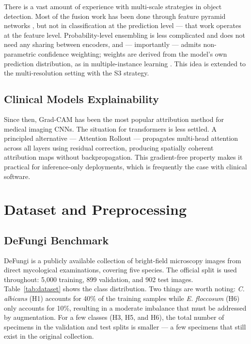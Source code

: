 \documentclass[conference]{IEEEtran}
\begin{document}
There is a vast amount of experience with multi-scale strategies in object
detection. Most of the fusion work has been done through feature pyramid
networks \cite{lin2017}, but not in classification at the prediction level
--- that work operates at the feature level. Probability-level ensembling is
less complicated and does not need any sharing between encoders, and ---
importantly --- admits non-parametric confidence weighting; weights are derived
from the model's own prediction distribution, as in multiple-instance learning
\cite{ilse2018}. This idea is extended to the multi-resolution setting with
the S3 strategy.

\subsection{Clinical Models Explainability}

Since then, Grad-CAM \cite{selvaraju2020} has been the most popular
attribution method for medical imaging CNNs. The situation for transformers
is less settled. A principled alternative --- Attention Rollout
\cite{abnar2020} --- propagates multi-head attention across all layers using
residual correction, producing spatially coherent attribution maps without
backpropagation. This gradient-free property makes it practical for
inference-only deployments, which is frequently the case with clinical
software.

\vspace{-2pt}
\section{Dataset and Preprocessing}

\subsection{DeFungi Benchmark}

DeFungi \cite{defungi2021} is a publicly available collection of bright-field
microscopy images from direct mycological examinations, covering five species.
The official split is used throughout: 5,000 training, 899 validation, and
902 test images. Table~\ref{tab:dataset} shows the class distribution. Two
things are worth noting: \textit{C. albicans} (H1) accounts for 40\% of the
training samples while \textit{E. floccosum} (H6) only accounts for 10\%,
resulting in a moderate imbalance that must be addressed by augmentation. For
a few classes (H3, H5, and H6), the total number of specimens in the
validation and test splits is smaller --- a few specimens that still exist in
the original collection.
\end{document}
